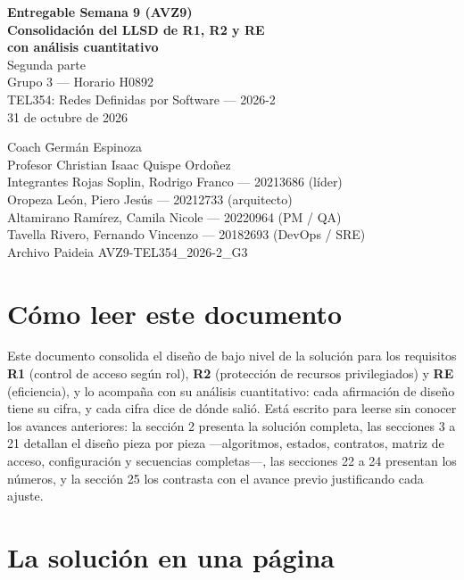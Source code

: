 \documentclass[11pt,a4paper]{article}
\begin{document}
\begin{titlepage}
\centering
\vspace*{1.2cm}
{\Large\bfseries Entregable Semana 9 (AVZ9)}\\[0.6cm]
{\LARGE\bfseries\color{azul} Consolidación del LLSD de R1, R2 y RE\\[0.2cm] con análisis cuantitativo}\\[0.4cm]
{\large Segunda parte}\\[1.2cm]
{\large Grupo 3 --- Horario H0892}\\[0.2cm]
{\large TEL354: Redes Definidas por Software --- 2026-2}\\[0.2cm]
{\large 31 de octubre de 2026}\\[1.6cm]
\begin{tabbing}
Coach \hspace{1.4cm} \= Germán Espinoza\\[2pt]
Profesor \> Christian Isaac Quispe Ordoñez\\[2pt]
Integrantes \> Rojas Soplin, Rodrigo Franco --- 20213686 (líder)\\[2pt]
\> Oropeza León, Piero Jesús --- 20212733 (arquitecto)\\[2pt]
\> Altamirano Ramírez, Camila Nicole --- 20220964 (PM / QA)\\[2pt]
\> Tavella Rivero, Fernando Vincenzo --- 20182693 (DevOps / SRE)\\[6pt]
Archivo Paideia \> AVZ9-TEL354\_2026-2\_G3
\end{tabbing}
\end{titlepage}

\section*{Cómo leer este documento}
Este documento consolida el diseño de bajo nivel de la solución para los requisitos \textbf{R1} (control de acceso según rol), \textbf{R2} (protección de recursos privilegiados) y \textbf{RE} (eficiencia), y lo acompaña con su análisis cuantitativo: cada afirmación de diseño tiene su cifra, y cada cifra dice de dónde salió. Está escrito para leerse sin conocer los avances anteriores: la sección 2 presenta la solución completa, las secciones 3 a 21 detallan el diseño pieza por pieza ---algoritmos, estados, contratos, matriz de acceso, configuración y secuencias completas---, las secciones 22 a 24 presentan los números, y la sección 25 los contrasta con el avance previo justificando cada ajuste.

\section{La solución en una página}
\end{document}
